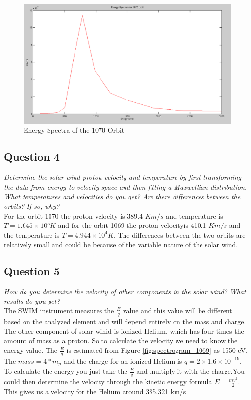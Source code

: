 \documentclass{article}
\begin{document}
\begin{figure}[htb!]
\centering
\includegraphics[scale = 0.35]{Figures/energy_spectra_1070.png}
\caption{Energy Spectra of the 1070 Orbit}
\label{fig:energy_spectra_1070}
\end{figure}

\subsection{Question 4}
\textit{Determine the solar wind proton velocity and temperature by first transforming the
data from energy to velocity space and then fitting a Maxwellian distribution. What
temperatures and velocities do you get? Are there differences between the orbits? If
so, why?}\\

For the orbit 1070 the proton velocity is 389.4 $Km/s$ and temperature is $T= 1.645 \times 10^5 K$ 
and for the orbit 1069 the proton velocityis 410.1 $Km/s$ and the temperature is  $T = 4.944 \times 10^4 K $. The differences between the two orbits are relatively small and could be because of the variable nature of the solar wind.


\subsection{Question 5}
\textit{How do you determine the velocity of other components in the solar wind? What
results do you get?}\\

The SWIM instrument measures the $ \frac{E}{q}$ value and this value will be different based
on the analyzed element and will depend entirely on the mass and charge. The other component of solar winid is ionized Helium, which has four times the amount of mass as a proton. So to calculate the velocity we need to know the energy value. The $ \frac{E}{q}$ is estimated from Figure \ref{fig:spectrogram_1069} as 1550 eV. The $mass = 4*m_p$ and the charge for an ionized Helium is
$q=2 \times 1.6 \times 10^{-19}$. To calculate the energy you just take the $ \frac{E}{q}$ and multiply it with the charge.You could then determine the velocity through the kinetic energy formula $ E = \frac{mv^2}{2}$. This gives us a velocity for the Helium around 385.321 km/s
\end{document}
